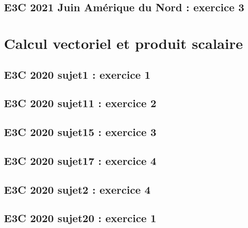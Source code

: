\documentclass[lang=fr,edition=teacher,layout=sheet]{mxbook}
\begin{document}
\subsection*{E3C 2021 Juin Amérique du Nord : exercice 3}
\begingroup\endgroup
\par\bigskip
\clearpage\section*{Calcul vectoriel et produit scalaire}
\subsection*{E3C 2020 sujet1 : exercice 1}
\begingroup\endgroup
\par\bigskip
{}\subsection*{E3C 2020 sujet11 : exercice 2}
\begingroup\endgroup
\par\bigskip
{}\subsection*{E3C 2020 sujet15 : exercice 3}
\begingroup\endgroup
\par\bigskip
{}\subsection*{E3C 2020 sujet17 : exercice 4}
\begingroup\endgroup
\par\bigskip
{}\subsection*{E3C 2020 sujet2 : exercice 4}
\begingroup\endgroup
\par\bigskip
{}\subsection*{E3C 2020 sujet20 : exercice 1}
\end{document}
